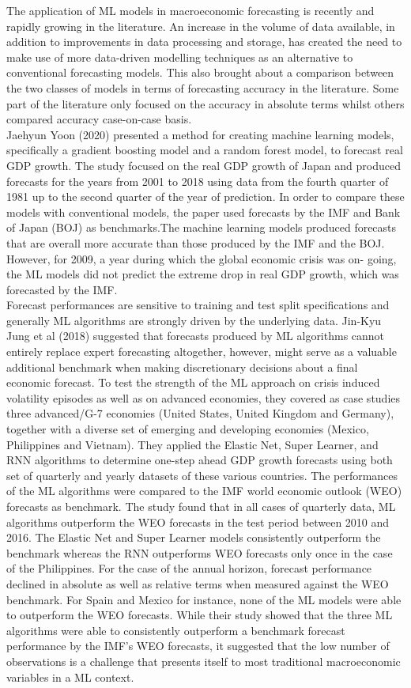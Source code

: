 \documentclass[12pt,italian, twoside]{report}
\begin{document}
The application of ML models in macroeconomic forecasting is recently and rapidly growing in the literature. An increase in the volume of data available, in addition to improvements in data processing and storage, has created the need to make use of more data-driven modelling techniques as an alternative to conventional forecasting models. This also brought about a comparison between the two classes of models in terms of forecasting accuracy in the literature. Some part of the literature only focused on the accuracy in absolute terms whilst others compared accuracy case-on-case basis.\\
Jaehyun Yoon (2020) presented a method for creating machine learning models, specifically a gradient boosting model and a random forest model, to forecast real GDP growth. The study focused on the real GDP growth of Japan and produced forecasts for the years from 2001 to 2018 using data from the fourth quarter of 1981 up to the second quarter of the year of prediction. In order to compare these models with conventional models, the paper used forecasts by the IMF and Bank of Japan (BOJ) as benchmarks.The machine learning models produced forecasts that are overall more accurate than those produced by the IMF and the BOJ. However, for 2009, a year during which the global economic crisis was on- going, the ML models did not predict the extreme drop in real GDP growth, which was forecasted by the IMF.\\
Forecast performances are sensitive to training and test split specifications and generally ML algorithms are strongly driven by the underlying data. Jin-Kyu Jung et al (2018) suggested that forecasts produced by ML algorithms cannot entirely replace expert forecasting altogether, however, might serve as a valuable additional benchmark when making discretionary decisions about a final economic forecast. To test the strength of the ML approach on crisis induced volatility episodes as well as on advanced economies, they covered as case studies three advanced/G-7 economies (United States, United Kingdom and Germany), together with a diverse set of emerging and developing economies (Mexico, Philippines and Vietnam). They applied the Elastic Net, Super Learner, and RNN algorithms to determine one-step ahead GDP growth forecasts using both set of quarterly and yearly datasets of these various countries. The performances of the ML algorithms were compared to the IMF world economic outlook (WEO) forecasts as benchmark. The study found that in all cases of quarterly data, ML algorithms outperform the WEO forecasts in the test period between 2010 and 2016. The Elastic Net and Super Learner models consistently outperform the benchmark whereas the RNN outperforms WEO forecasts only once in the case of the Philippines. For the case of the annual horizon, forecast performance declined in absolute as well as relative terms when measured against the WEO benchmark. For Spain and Mexico for instance, none of the ML models were able to outperform the WEO forecasts. While their study showed that the three ML algorithms were able to consistently outperform a benchmark forecast performance by the IMF’s WEO forecasts, it suggested that the low number of observations is a challenge that presents itself to most traditional macroeconomic variables in a ML context.
\end{document}
